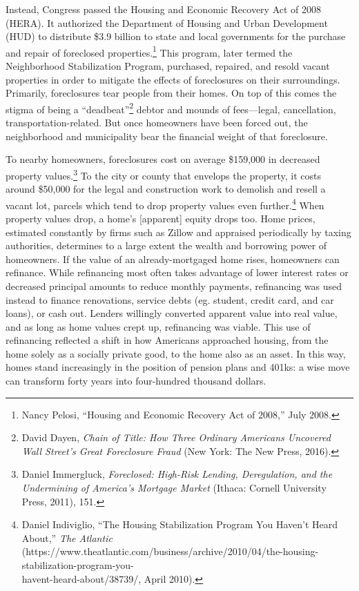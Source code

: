 \documentclass[12pt,oneside]{psthesis}
\begin{document}
Instead, Congress passed the Housing and Economic Recovery Act of 2008 (HERA). It authorized the Department of Housing and Urban Development (HUD) to distribute \$3.9 billion to state and local governments for the purchase and repair of foreclosed properties.\footnote{Nancy Pelosi, ``Housing and Economic Recovery Act of 2008,'' July 2008.}
This program, later termed the Neighborhood Stabilization Program, purchased, repaired, and resold vacant properties in order to mitigate the effects of foreclosures on their surroundings.
Primarily, foreclosures tear people from their homes.
On top of this comes the stigma of being a ``deadbeat''\footnote{David Dayen, \emph{Chain of Title: How Three Ordinary Americans Uncovered Wall Street's Great Foreclosure Fraud} (New York: The New Press, 2016).} debtor and mounds of fees---legal, cancellation, transportation-related.
But once homeowners have been forced out, the neighborhood and municipality bear the financial weight of that foreclosure.

To nearby homeowners, foreclosures cost on average \$159,000 in decreased property values.\footnote{Daniel Immergluck, \emph{Foreclosed: High-Risk Lending, Deregulation, and the Undermining of America's Mortgage Market} (Ithaca: Cornell University Press, 2011), 151.}
To the city or county that envelops the property, it costs around \$50,000 for the legal and construction work to demolish and resell a vacant lot, parcels which tend to drop property values even further.\footnote{Daniel Indiviglio, ``The Housing Stabilization Program You Haven't Heard About,'' \emph{The Atlantic} (https://www.theatlantic.com/business/archive/2010/04/the-housing-stabilization-program-you-\\havent-heard-about/38739/, April 2010).}
When property values drop, a home's {[}apparent{]} equity drops too.
Home prices, estimated constantly by firms such as Zillow and appraised periodically by taxing authorities, determines to a large extent the wealth and borrowing power of homeowners.
If the value of an already-mortgaged home rises, homeowners can refinance.
While refinancing most often takes advantage of lower interest rates or decreased principal amounts to reduce monthly payments, refinancing was used instead to finance renovations, service debts (eg. student, credit card, and car loans), or cash out.
Lenders willingly converted apparent value into real value, and as long as home values crept up, refinancing was viable.
This use of refinancing reflected a shift in how Americans approached housing, from the home solely as a socially private good, to the home also as an asset.
In this way, homes stand increasingly in the position of pension plans and 401ks: a wise move can transform forty years into four-hundred thousand dollars.
\end{document}
